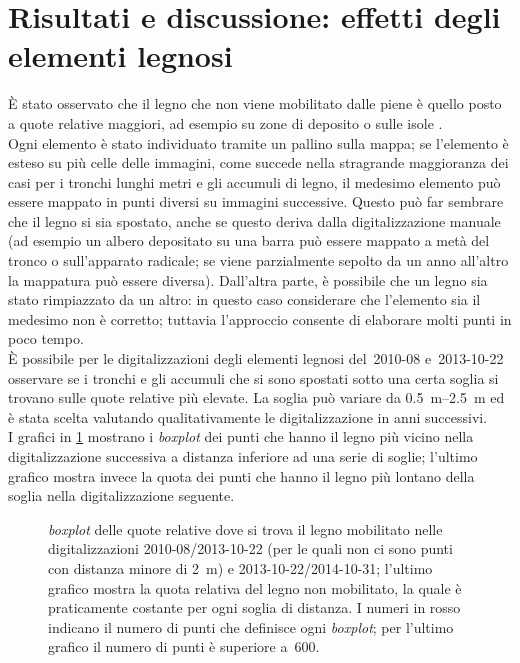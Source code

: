 \section{Risultati e discussione: effetti degli elementi legnosi}
È stato osservato che il legno che non viene mobilitato dalle piene è quello posto a quote relative maggiori, ad esempio su zone di deposito o sulle isole .
\\
Ogni elemento è stato individuato tramite un pallino sulla mappa; se l'elemento è esteso su più celle delle immagini, come succede nella stragrande maggioranza dei casi per i tronchi lunghi metri e gli accumuli di legno, il medesimo elemento può essere mappato in punti diversi su immagini successive.
Questo può far sembrare che il legno si sia spostato, anche se questo deriva dalla digitalizzazione manuale (ad esempio un albero depositato su una barra può essere mappato a metà del tronco o sull'apparato radicale; se viene parzialmente sepolto da un anno all'altro la mappatura può essere diversa).
Dall'altra parte, è possibile che un legno sia stato rimpiazzato da un altro: in questo caso considerare che l'elemento sia il medesimo non è corretto; tuttavia l'approccio consente di elaborare molti punti in poco tempo.
\\
È possibile per le digitalizzazioni degli elementi legnosi del~2010-08 e~2013-10-22 osservare se i tronchi e gli accumuli che si sono spostati sotto una certa soglia si trovano sulle quote relative più elevate.
La soglia può variare da \SIrange[range-phrase = { a }]{0.5}{2.5}{\m} ed è stata scelta valutando qualitativamente le digitalizzazione in anni successivi.
\\
I grafici in \cref{graph:elementi-dem-detrended-distanza} mostrano i \emph{boxplot} dei punti che hanno il legno più vicino nella digitalizzazione successiva a distanza inferiore ad una serie di soglie; l'ultimo grafico mostra invece la quota dei punti che hanno il legno più lontano della soglia nella digitalizzazione seguente.
%
\begin{figure}
	\centering
	
	\caption[\emph{boxplot} delle quote relative dove si trova il legno mobilitato]{\emph{boxplot} delle quote relative dove si trova il legno mobilitato nelle digitalizzazioni 2010-08/2013-10-22 (per le quali non ci sono punti con distanza minore di \SI{2}{\m}) e 2013-10-22/2014-10-31; l'ultimo grafico mostra la quota relativa del legno non mobilitato, la quale è praticamente costante per ogni soglia di distanza.
	I numeri in rosso indicano il numero di punti che definisce ogni \emph{boxplot}; per l'ultimo grafico il numero di punti è superiore a~\num{600}.}
	\label{graph:elementi-dem-detrended-distanza}
\end{figure}
%

